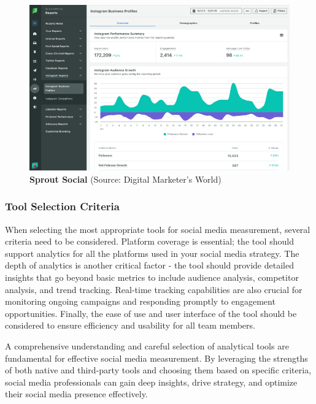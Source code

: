 \documentclass[
]{book}
\begin{document}
\begin{figure}
\centering
\includegraphics[width=1\textwidth,height=\textheight]{images/sprout.png}
\caption{\textbf{Sprout Social} (Source: Digital Marketer's World)}
\end{figure}

\hypertarget{tool-selection-criteria}{%
\subsubsection*{Tool Selection Criteria}\label{tool-selection-criteria}}

When selecting the most appropriate tools for social media measurement, several criteria need to be considered. Platform coverage is essential; the tool should support analytics for all the platforms used in your social media strategy. The depth of analytics is another critical factor - the tool should provide detailed insights that go beyond basic metrics to include audience analysis, competitor analysis, and trend tracking. Real-time tracking capabilities are also crucial for monitoring ongoing campaigns and responding promptly to engagement opportunities. Finally, the ease of use and user interface of the tool should be considered to ensure efficiency and usability for all team members.

A comprehensive understanding and careful selection of analytical tools are fundamental for effective social media measurement. By leveraging the strengths of both native and third-party tools and choosing them based on specific criteria, social media professionals can gain deep insights, drive strategy, and optimize their social media presence effectively.
\end{document}
